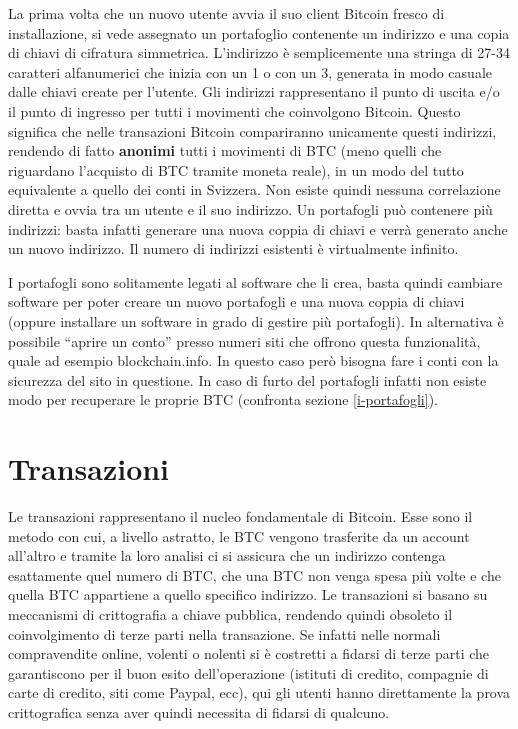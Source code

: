 La prima volta che un nuovo utente avvia il suo client Bitcoin fresco di installazione, si vede assegnato un portafoglio contenente un indirizzo e una copia di chiavi di cifratura simmetrica. L'indirizzo è semplicemente una stringa di 27-34 caratteri alfanumerici che inizia con un 1 o con un 3, generata in modo casuale dalle chiavi create per l'utente. Gli indirizzi rappresentano il punto di uscita e/o il punto di ingresso per tutti i movimenti che coinvolgono Bitcoin. Questo significa che nelle transazioni Bitcoin compariranno unicamente questi indirizzi, rendendo di fatto \textbf{anonimi} tutti i movimenti di BTC (meno quelli che riguardano l'acquisto di BTC tramite moneta reale), in un modo del tutto equivalente a quello dei conti in Svizzera. Non esiste quindi nessuna correlazione diretta e ovvia tra un utente e il suo indirizzo. Un portafogli può contenere più indirizzi: basta infatti generare una nuova coppia di chiavi e verrà generato anche un nuovo indirizzo. Il numero di indirizzi esistenti è virtualmente infinito.

I portafogli sono solitamente legati al software che li crea, basta quindi cambiare software per poter creare un nuovo portafogli e una nuova coppia di chiavi (oppure installare un software in grado di gestire più portafogli). In alternativa è possibile ``aprire un conto'' presso numeri siti che offrono questa funzionalità, quale ad esempio blockchain.info. In questo caso però bisogna fare i conti con la sicurezza del sito in questione. In caso di furto del portafogli infatti non esiste modo per recuperare le proprie BTC (confronta sezione \ref{i-portafogli}).

\section{Transazioni}\label{transazioni}

Le transazioni rappresentano il nucleo fondamentale di Bitcoin. Esse sono il metodo con cui, a livello astratto, le BTC vengono trasferite da un account all'altro e tramite la loro analisi ci si assicura che un indirizzo contenga esattamente quel numero di BTC, che una BTC non venga spesa più volte e che quella BTC appartiene a quello specifico indirizzo. Le transazioni si basano su meccanismi di crittografia a chiave pubblica, rendendo quindi obsoleto il coinvolgimento di terze parti nella transazione. Se infatti nelle normali compravendite online, volenti o nolenti si è costretti a fidarsi di terze parti che garantiscono per il buon esito dell'operazione (istituti di credito, compagnie di carte di credito, siti come Paypal, ecc), qui gli utenti hanno direttamente la prova crittografica senza aver quindi necessita di fidarsi di qualcuno.

